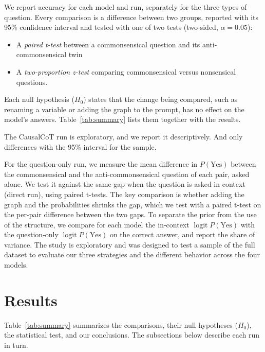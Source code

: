 \documentclass{llncs}
\begin{document}
We report accuracy for each model and run, separately for the three types of question. Every comparison is a difference between two groups, reported with its 95\% confidence interval and tested with one of two tests (two-sided, $\alpha = 0.05$):
\begin{itemize}
\item A \textit{paired t-test} between a commonsensical question and its anti-commonsensical twin 
\item A \emph{two-proportion z-test} comparing commonsensical versus nonsensical questions.
\end{itemize}
Each null hypothesis ($H_0$) states that the change being compared, such as renaming a variable or adding the graph to the prompt, has no effect on the model's answers. Table~\ref{tab:summary} lists them together with the results.

The CausalCoT run is exploratory, and we report it descriptively.  And only differences with the 95\% interval for the sample. 


For the question-only run, we measure the mean difference in $P(\text{Yes})$ between the commonsensical and the anti-commonsensical question of each pair, asked alone. We test it against the same gap when the question is asked in context (direct run), using paired t-tests. The key comparison is whether adding the graph and the probabilities shrinks the gap, which we test with a paired t-test on the per-pair difference between the two gaps. To separate the prior from the use of the structure, we compare for each model the in-context $\operatorname{logit} P(\text{Yes})$ with the question-only $\operatorname{logit} P(\text{Yes})$ on the correct answer, and report the share of variance. The study is exploratory and was designed to test a sample of the full dataset to evaluate our three strategies and the different behavior across the four models.  

\section{Results}
\label{sec:results}

Table~\ref{tab:summary} summarizes the comparisons, their null hypotheses ($H_0$), the statistical test, and our conclusions. The subsections below describe each run in turn.
\end{document}
